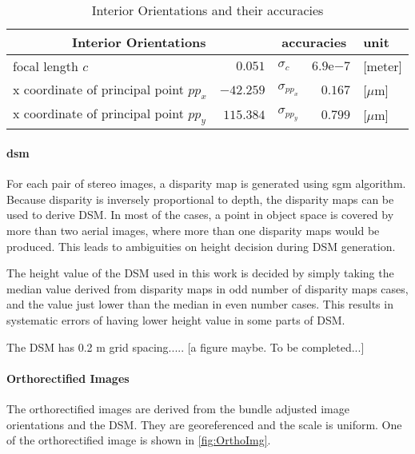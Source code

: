 \begin{table}%
    \centering
    \begin{tabular}{lr|lr|l}
    \toprule
    \multicolumn{2}{c|}{Interior Orientations}  & \multicolumn{2}{c|}{accuracies} & unit\\
    \midrule
    focal length $c$                       &   $0.051$ & $\sigma_c$      & $6.9\mathrm{e}{-7}$ & [meter]\\
    x coordinate of principal point $pp_x$ & $-42.259$ & $\sigma_{pp_x}$ & $0.167$             &[$\mu$m]\\
    x coordinate of principal point $pp_y$ & $115.384$ & $\sigma_{pp_y}$ & $0.799$             &[$\mu$m]\\
    \bottomrule
    \end{tabular}
    \caption{Interior Orientations and their accuracies}
    \label{tab:IOaccuracy}
\end{table}

\clearpage
\paragraph{\gls{dsm}}
For each pair of stereo images, a disparity map is generated using \gls{sgm} algorithm. Because disparity is inversely proportional to depth, the disparity maps can be used to derive DSM. In most of the cases, a point in object space is covered by more than two aerial images, where more than one disparity maps would be produced. This leads to ambiguities on height decision during DSM generation.

The height value of the DSM used in this work is decided by simply taking the median value derived from disparity maps in odd number of disparity maps cases, and the value just lower than the median in even number cases. This results in systematic errors of having lower height value in some parts of DSM.

The DSM has 0.2 m grid spacing..... [a figure maybe. To be completed...]




\paragraph{Orthorectified Images}
The orthorectified images are derived from the bundle adjusted image orientations and the DSM. They are georeferenced and the scale is uniform. One of the orthorectified image is shown in \cref{fig:OrthoImg}.

